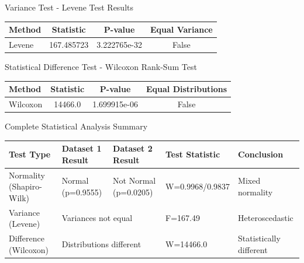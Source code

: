 \documentclass[10pt]{beamer}
\begin{document}
{   \begin{frame}{Variance Test - Levene Test Results}
   \centering
   \begin{tabular}{l S[table-format=3.6] S[table-format=1.6e1] c}
   \toprule
   \textbf{Method} & \textbf{Statistic} & \textbf{P-value} & \textbf{Equal Variance} \\
   \midrule
   Levene & 167.485723 & 3.222765e-32 & False \\
   \bottomrule
   \end{tabular}
   \end{frame}

   \begin{frame}{Statistical Difference Test - Wilcoxon Rank-Sum Test}
   \centering
   \begin{tabular}{l S[table-format=5.1] S[table-format=1.6e1] c}
   \toprule
   \textbf{Method} & \textbf{Statistic} & \textbf{P-value} & \textbf{Equal Distributions} \\
   \midrule
   Wilcoxon & 14466.0 & 1.699915e-06 & False \\
   \bottomrule
   \end{tabular}
   \end{frame}

   \begin{frame}{Complete Statistical Analysis Summary}
   \centering
   \scriptsize
   \begin{tabular}{l l l l l}
   \toprule
   \textbf{Test Type} & \textbf{Dataset 1 Result} & \textbf{Dataset 2 Result} & \textbf{Test Statistic} & \textbf{Conclusion} \\
   \midrule
   Normality (Shapiro-Wilk) & Normal (p=0.9555) & Not Normal (p=0.0205) & W=0.9968/0.9837 & Mixed normality \\
   Variance (Levene) & \multicolumn{2}{l}{Variances not equal} & F=167.49 & Heteroscedastic \\
   Difference (Wilcoxon) & \multicolumn{2}{l}{Distributions different} & W=14466.0 & Statistically different \\
   \bottomrule
   \end{tabular}
   

\end{frame}}
\end{document}
